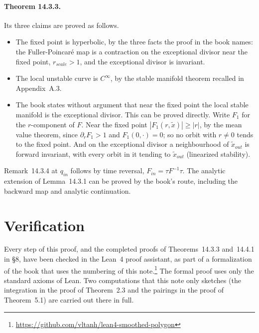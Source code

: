 \documentclass[11pt,a4paper]{article}
\theoremstyle{plain}
\theoremstyle{definition}
\theoremstyle{remark}
\newcommand{\rs}{r_{scale}}
\begin{document}
\paragraph{Theorem 14.3.3.} Its three claims are proved as follows.
\begin{itemize}[itemsep=1pt]
\item The fixed point is hyperbolic, by the three facts the proof in the book names: the
Fuller-Poincar\'e map is a contraction on the exceptional divisor near the fixed point, $\rs>1$,
and the exceptional divisor is invariant.
\item The local unstable curve is $C^\infty$, by the stable manifold theorem recalled in
Appendix~A.3.
\item The book states without argument that near the fixed point the local stable manifold is the
exceptional divisor. This can be proved directly. Write $F_1$ for the $r$-component of $F$. Near
the fixed point $|F_1(r,\tilde x)|\ge|r|$, by the mean value theorem, since $\partial_rF_1>1$ and
$F_1(0,\cdot)=0$; so no orbit with $r\ne0$ tends to the fixed point. And on the exceptional
divisor a neighbourhood of $\tilde x_{out}$ is forward invariant, with every orbit in it tending
to $\tilde x_{out}$ (linearized stability).
\end{itemize}
Remark~14.3.4 at $q_{in}$ follows by time reversal, $F_{in}=\tau F^{-1}\tau$. The analytic extension
of Lemma~14.3.1 can be proved by the book's route, including the backward map and analytic
continuation.

\section{Verification}

Every step of this proof, and the completed proofs of Theorems~14.3.3 and~14.4.1 in \S8, have been
checked in the Lean~4 proof assistant, as part of a formalization of the book that uses the
numbering of this note.\footnote{\url{https://github.com/vltanh/lean4-smoothed-polygon}} The
formal proof uses only the standard axioms of Lean. Two computations that this note only sketches
(the integration in the proof of Theorem~2.3 and the pairings in the proof of Theorem~5.1) are
carried out there in full.
\end{document}
